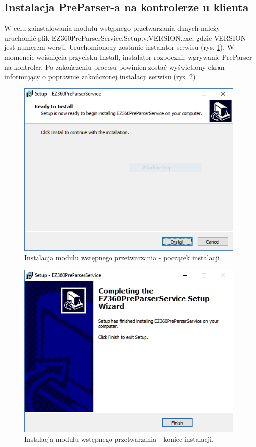 \documentclass[a4paper]{book}
\begin{document}
\subsection{Instalacja PreParser-a na kontrolerze u klienta}
W celu zainstalowania  modułu wstępnego przetwarzania danych należy uruchomić plik EZ360PreParserService.Setup.v.VERSION.exe, gdzie VERSION jest numerem wersji.
Uruchomionony zostanie instalator serwisu (rys. \ref{fig:preparser_installation_part1}). W momencie wciśnięcia przycisku Install, instalator rozpocznie wgrywanie PreParser na kontroler. Po zakończeniu procesu powinien zostać wyświetlony ekran informujący o poprawnie zakończonej instalacji serwisu (rys. \ref{fig:preparser_installation_part2})
\begin{figure}[t]
	\centering
	\includegraphics{./img/preparser_installation_part1.png}
	\caption{Instalacja modułu wstępnego przetwarzania - początek instalacji.}
	\label{fig:preparser_installation_part1}
\end{figure}
\begin{figure}[t]
	\centering
	\includegraphics{./img/preparser_installation_part2.png}
	\caption{Instalacja modułu wstępnego przetwarzania - koniec instalacji.}
	\label{fig:preparser_installation_part2}
\end{figure}
\end{document}
